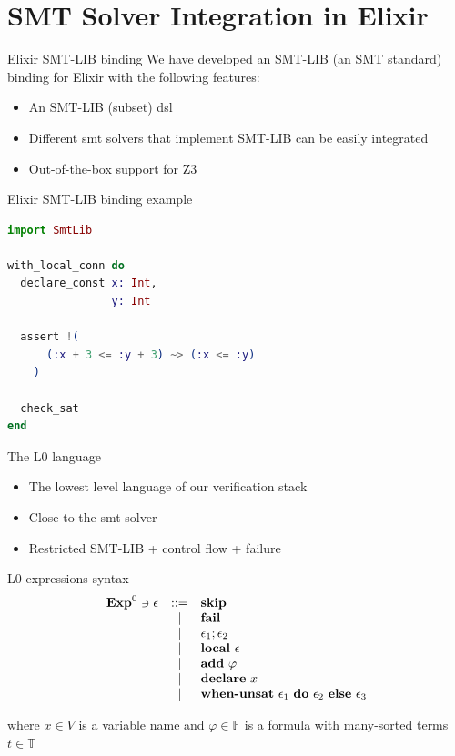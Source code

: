 \documentclass{beamer}
\begin{document}
  \section{SMT Solver Integration in Elixir}
  \begin{frame}{Elixir SMT-LIB binding}
    We have developed an SMT-LIB (an SMT standard) binding for Elixir with the following features:

    \begin{itemize}
      \item \pause An SMT-LIB (subset) \gls*{dsl}
      \item \pause Different \acrshort*{smt} solvers that implement SMT-LIB can be easily integrated
      \item \pause Out-of-the-box support for Z3
    \end{itemize}
  \end{frame}
  \begin{frame}[fragile]{Elixir SMT-LIB binding example}
    \small
    \begin{lstlisting}[language=elixir,numbers=none,frame=none]
import SmtLib

with_local_conn do
  declare_const x: Int,
                y: Int

  assert !(
      (:x + 3 <= :y + 3) ~> (:x <= :y)
    )

  check_sat
end
      \end{lstlisting}
  \end{frame}
  \begin{frame}{The L0 language}
    \begin{itemize}
      \item \pause The lowest level language of our verification stack
      \item \pause Close to the \acrshort*{smt} solver
      \item \pause Restricted SMT-LIB + control flow + failure
    \end{itemize}
  \end{frame}
  \begin{frame}{L0 expressions syntax}
    \[
      \begin{array}{rcll}
        \mathbf{Exp}^{0} \ni \epsilon & ::= & \textbf{skip} \\
        & | & \textbf{fail} \\
        & | & \epsilon_1;\epsilon_2 \\
        & | & \textbf{local}~\epsilon \\
        & | & \textbf{add}~\varphi \\
        & | & \textbf{declare}~x \\
        & | & \textbf{when-unsat}~\epsilon_1~\textbf{do}~\epsilon_2~\textbf{else}~\epsilon_3 \\
      \end{array}
    \]

    \pause where $x \in V$ is a variable name and $\varphi \in \mathbb{F}$ is a 
    formula with many-sorted terms $t \in \mathbb{T}$
  \end{frame}
\end{document}
